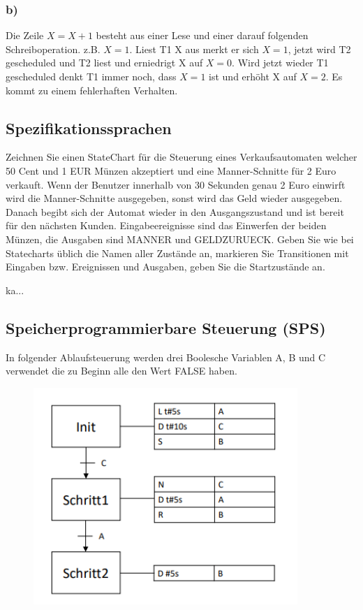 \subsubsection{b)}
Die Zeile $X = X + 1$ besteht aus einer Lese und einer darauf folgenden Schreiboperation.
z.B. $X=1$. Liest T1 X aus merkt er sich $X=1$, jetzt wird T2 gescheduled und T2 liest und erniedrigt X auf $X=0$.
Wird jetzt wieder T1 gescheduled denkt T1 immer noch, dass $X=1$ ist und erhöht X auf $X=2$. Es kommt zu einem
fehlerhaften Verhalten.

\subsection{Spezifikationssprachen}
Zeichnen Sie einen StateChart für die Steuerung eines Verkaufsautomaten welcher 50 Cent und 1 EUR
Münzen akzeptiert und eine Manner-Schnitte für 2 Euro verkauft. Wenn der Benutzer innerhalb von 30
Sekunden genau 2 Euro einwirft wird die Manner-Schnitte ausgegeben, sonst wird das Geld wieder
ausgegeben. Danach begibt sich der Automat wieder in den Ausgangszustand und ist bereit für den
nächsten Kunden. Eingabeereignisse sind das Einwerfen der beiden Münzen, die Ausgaben sind MANNER
und GELDZURUECK.
Geben Sie wie bei Statecharts üblich die Namen aller Zustände an, markieren Sie Transitionen mit Eingaben
bzw. Ereignissen und Ausgaben, geben Sie die Startzustände an.

ka...
\subsection{Speicherprogrammierbare Steuerung (SPS)}
In folgender Ablaufsteuerung werden drei Boolesche Variablen A, B und C verwendet die zu Beginn alle den
Wert FALSE haben. 

\begin{figure}[H]
  \includegraphics[width=10cm]{images/KA140421/6a.PNG}
  \centering
\end{figure}

